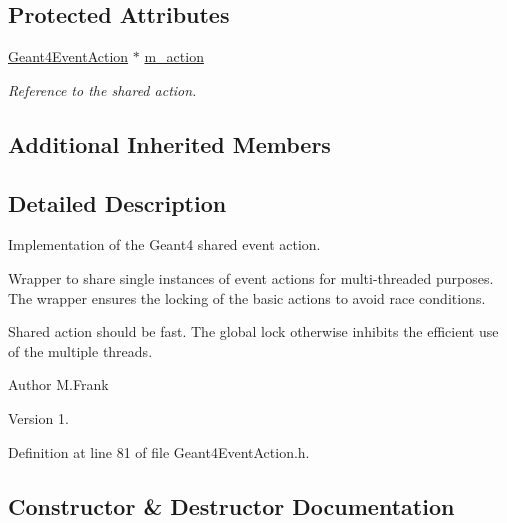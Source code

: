 \subsection*{Protected Attributes}
\begin{DoxyCompactItemize}
\item 
\hyperlink{class_d_d4hep_1_1_simulation_1_1_geant4_event_action}{Geant4\+Event\+Action} $\ast$ \hyperlink{class_d_d4hep_1_1_simulation_1_1_geant4_shared_event_action_aa79a57a0581a48e4f211acec481ada26}{m\+\_\+action}
\begin{DoxyCompactList}\small\item\em Reference to the shared action. \end{DoxyCompactList}\end{DoxyCompactItemize}
\subsection*{Additional Inherited Members}


\subsection{Detailed Description}
Implementation of the Geant4 shared event action. 

Wrapper to share single instances of event actions for multi-\/threaded purposes. The wrapper ensures the locking of the basic actions to avoid race conditions.

Shared action should be \textquotesingle{}fast\textquotesingle{}. The global lock otherwise inhibits the efficient use of the multiple threads.

\begin{DoxyAuthor}{Author}
M.\+Frank 
\end{DoxyAuthor}
\begin{DoxyVersion}{Version}
1. 
\end{DoxyVersion}


Definition at line 81 of file Geant4\+Event\+Action.\+h.



\subsection{Constructor \& Destructor Documentation}
\hypertarget{class_d_d4hep_1_1_simulation_1_1_geant4_shared_event_action_a81782b16c36081abd74eb6a0bed051c6}{}\label{class_d_d4hep_1_1_simulation_1_1_geant4_shared_event_action_a81782b16c36081abd74eb6a0bed051c6} 
